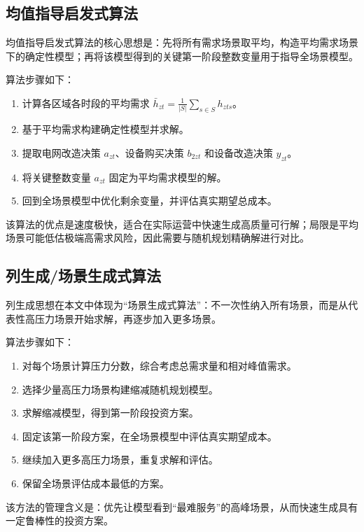\documentclass[12pt,a4paper]{article}
\newcommand{\手批注}[2]{\textcolor{#1}{\text{\kaishu #2}}}
\newcommand{\一阶段}{\textcolor{firststage}{\text{\kaishu （一阶段）}}}
\newcommand{\二阶段}{\textcolor{secondstage}{\text{\kaishu （二阶段）}}}
\begin{document}
\subsection{均值指导启发式算法}

均值指导启发式算法的核心思想是：先将所有需求场景取平均，构造平均需求场景下的确定性模型；再将该模型得到的关键第一阶段整数变量用于指导全场景模型。

算法步骤如下：
\begin{enumerate}[itemsep=0.2em,leftmargin=2em]
    \item 计算各区域各时段的平均需求 $\bar{h}_{zt}=\frac{1}{|S|}\sum_{s\in S}h_{zts}$。
    \item 基于平均需求构建确定性模型并求解。
    \item 提取电网改造决策 $a_{zt}$、设备购买决策 $b_{2zt}$ 和设备改造决策 $y_{zt}$。
    \item 将关键整数变量 $a_{zt}$ 固定为平均需求模型的解。
    \item 回到全场景模型中优化剩余变量，并评估真实期望总成本。
\end{enumerate}

该算法的优点是速度极快，适合在实际运营中快速生成高质量可行解；局限是平均场景可能低估极端高需求风险，因此需要与随机规划精确解进行对比。

\subsection{列生成/场景生成式算法}

列生成思想在本文中体现为“场景生成式算法”：不一次性纳入所有场景，而是从代表性高压力场景开始求解，再逐步加入更多场景。

算法步骤如下：
\begin{enumerate}[itemsep=0.2em,leftmargin=2em]
    \item 对每个场景计算压力分数，综合考虑总需求量和相对峰值需求。
    \item 选择少量高压力场景构建缩减随机规划模型。
    \item 求解缩减模型，得到第一阶段投资方案。
    \item 固定该第一阶段方案，在全场景模型中评估真实期望成本。
    \item 继续加入更多高压力场景，重复求解和评估。
    \item 保留全场景评估成本最低的方案。
\end{enumerate}

该方法的管理含义是：优先让模型看到“最难服务”的高峰场景，从而快速生成具有一定鲁棒性的投资方案。
\end{document}

